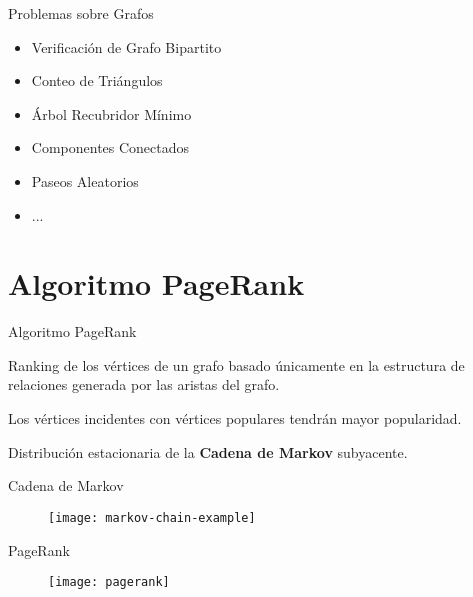 \documentclass[12pt]{beamer}
\begin{document}
    \begin{frame}[fragile]{Problemas sobre Grafos}

      \begin{itemize}
        \item Verificación de Grafo Bipartito
        \item Conteo de Triángulos
        \item Árbol Recubridor Mínimo
        \item Componentes Conectados
        \item Paseos Aleatorios
        \item ...
      \end{itemize}

    \end{frame}

  \section{Algoritmo PageRank}

    \begin{frame}[fragile]{Algoritmo PageRank}

      Ranking de los vértices de un grafo basado únicamente en la estructura de relaciones generada por las aristas del grafo.

      Los vértices incidentes con vértices populares tendrán mayor popularidad.

      Distribución estacionaria de la \textbf{Cadena de Markov} subyacente.

    \end{frame}

    \begin{frame}[fragile]{Cadena de Markov}

      \begin{figure}
        \texttt{[image: markov-chain-example]}
        \caption{}
        \label{}
      \end{figure}

    \end{frame}

    \begin{frame}[fragile]{PageRank}

      \begin{figure}
        \texttt{[image: pagerank]}
        \caption{}
        \label{}
      \end{figure}

    \end{frame}
\end{document}
